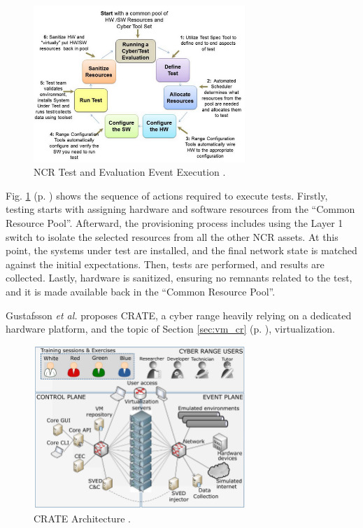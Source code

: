 \begin{figure}[H]
    \includegraphics[width=8cm]{figures/ncr_test_evaluation.png}
    \caption{NCR Test and Evaluation Event Execution \cite{national_cr_ref}.}
    \label{fig:ncr_test_evaluation}
\end{figure}

Fig. \ref{fig:ncr_test_evaluation} (p. \pageref{fig:ncr_test_evaluation}) shows the sequence of actions required to execute tests. Firstly, testing starts with assigning hardware and software resources from the ``Common Resource Pool''. Afterward, the provisioning process includes using the Layer 1 switch to isolate the selected resources from all the other NCR assets. At this point, the systems under test are installed, and the final network state is matched against the initial expectations. Then, tests are performed, and results are collected. Lastly, hardware is sanitized, ensuring no remnants related to the test, and it is made available back in the ``Common Resource Pool''.

Gustafsson \textit{et al.} \cite{crate_ref} proposes CRATE, a cyber range heavily relying on a dedicated hardware platform, and the topic of Section \ref{sec:vm_cr} (p. \pageref{sec:vm_cr}), virtualization.

\begin{figure}[ht]
    \includegraphics[width=8cm]{figures/crate_architecture.png}
    \caption{CRATE Architecture \cite{crate_ref}.}
    \label{fig:crate_architecture}
\end{figure}

